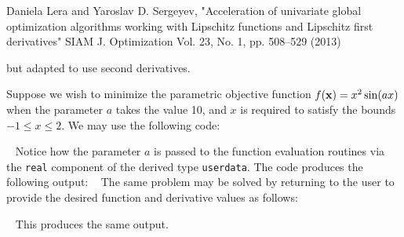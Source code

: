 \documentclass{galahad}
\begin{document}
\noindent
Daniela Lera and Yaroslav D. Sergeyev,
"Acceleration of univariate global optimization algorithms working with
 Lipschitz functions and Lipschitz first derivatives"
SIAM J. Optimization Vol. 23, No. 1, pp. 508–529 (2013)

\noindent
but adapted to use second derivatives.


\galexamples
Suppose we wish to minimize the parametric objective function
$f({\mathbf{x}}) =  x^2 \sin(ax)$
when the parameter $a$ takes the value 10, and $x$ is required to satisfy
the  bounds $-1 \leq x \leq 2$.
We may use the following code:

{\tt \small
\VerbatimInput{\packageexample}
}
\noindent
Notice how the parameter $a$ is passed to the function evaluation
routines via the {\tt real} component of the derived type {\tt userdata}.
The code produces the following output:
{\tt \small
\VerbatimInput{\packageresults}
}
\noindent
The same problem may be solved by returning to the user to provide
the desired function and derivative values as follows:

{\tt \small
\VerbatimInput{\packageexampleb}
}
\noindent
This produces the same output.
\end{document}

